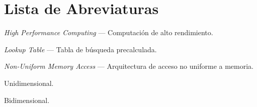 \chapter*{Lista de Abreviaturas}

\begin{abbrv}
    \item[\textbf{HPC}] \textit{High Performance Computing} --- Computación de alto rendimiento.
    \item[\textbf{LUT}] \textit{Lookup Table} --- Tabla de búsqueda precalculada.
    \item[\textbf{NUMA}] \textit{Non-Uniform Memory Access} --- Arquitectura de acceso no uniforme a memoria.
    \item[\textbf{1D}] Unidimensional.
    \item[\textbf{2D}] Bidimensional.
\end{abbrv}
